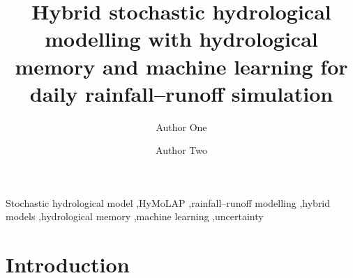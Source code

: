 \documentclass[preprint,12pt]{elsarticle}
\begin{document}
\begin{frontmatter}

\title{Hybrid stochastic hydrological modelling with hydrological memory and machine learning for daily rainfall--runoff simulation}

\author[inst1]{Author One}
\author[inst2]{Author Two}
\address[inst1]{Institution, City, Country}
\address[inst2]{Institution, City, Country}

\begin{abstract}
\end{abstract}

\begin{keyword}
Stochastic hydrological model \sep HyMoLAP \sep rainfall--runoff modelling \sep hybrid models \sep hydrological memory \sep machine learning \sep uncertainty
\end{keyword}

\end{frontmatter}

\linenumbers

\section{Introduction}
\end{document}
